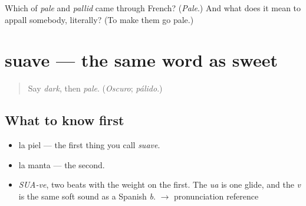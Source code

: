 \begin{tcolorbox}[breakable,colback=teal!4,colframe=teal!35!black,title={Before you move on}]
Which of \emph{pale} and \emph{pallid} came through French? (\emph{Pale}.) And what does it mean to appall somebody, literally? (To make them go pale.)
\end{tcolorbox}
\section[suave]{suave — the same word as sweet}

\label{lesson:ES-C372-suave}



\begin{quote}
Say \emph{dark}, then \emph{pale}. (\emph{Oscuro}; \emph{pálido}.)
\end{quote}

\subsection*{What to know first}
\begin{itemize}
\raggedright
  \item la piel — the first thing you call \emph{suave}.
  \item la manta — the second.
\end{itemize}

\begin{sounds}
\begin{itemize}
\raggedright
  \item \emph{SUA-ve}, two beats with the weight on the first. The \emph{ua} is one glide, and the \emph{v} is the same soft sound as a Spanish \emph{b}. $\to$ pronunciation reference
\end{itemize}
\end{sounds}

